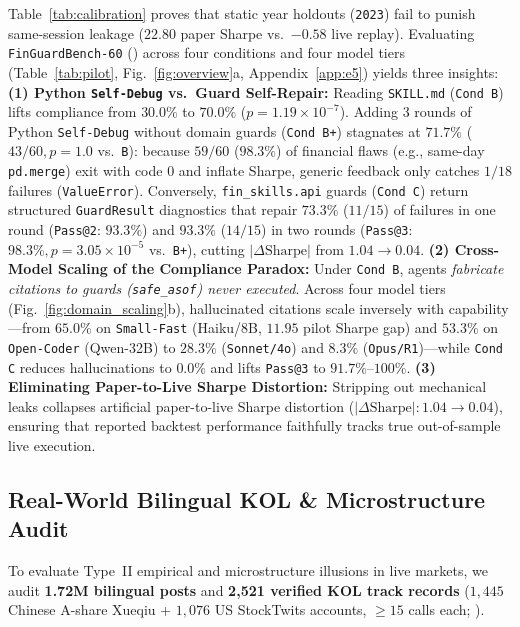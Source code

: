 Table~\ref{tab:calibration} proves that static year holdouts (\texttt{2023}) fail to punish same-session leakage ($22.80$ paper Sharpe vs.\ $-0.58$ live replay). Evaluating \texttt{FinGuardBench-60} () across four conditions and four model tiers (Table~\ref{tab:pilot}, Fig.~\ref{fig:overview}a, Appendix~\ref{app:e5}) yields three insights:
\textbf{(1) Python \texttt{Self-Debug} vs.\ Guard Self-Repair:} Reading \texttt{SKILL.md} (\texttt{Cond B}) lifts compliance from $30.0\%$ to $70.0\%$ ($p=1.19\times 10^{-7}$). Adding 3 rounds of Python \texttt{Self-Debug} \citep{chen2023selfdebug} without domain guards (\texttt{Cond B+}) stagnates at $71.7\%$ ($43/60, p=1.0$ vs.\ \texttt{B}): because $59/60$ ($98.3\%$) of financial flaws (e.g., same-day \texttt{pd.merge}) exit with code $0$ and inflate Sharpe, generic feedback only catches $1/18$ failures (\texttt{ValueError}). Conversely, \texttt{fin\_skills.api} guards (\texttt{Cond C}) return structured \texttt{GuardResult} diagnostics that repair $73.3\%$ ($11/15$) of failures in one round (\texttt{Pass@2}: $93.3\%$) and $\mathbf{93.3\%}$ ($14/15$) in two rounds (\texttt{Pass@3}: $\mathbf{98.3\%}, p=3.05\times 10^{-5}$ vs.\ \texttt{B+}), cutting $|\Delta\text{Sharpe}|$ from $1.04 \to 0.04$.
\textbf{(2) Cross-Model Scaling of the Compliance Paradox:} Under \texttt{Cond B}, agents \emph{fabricate citations to guards (\texttt{safe\_\allowbreak asof}) never executed}. Across four model tiers (Fig.~\ref{fig:domain_scaling}b), hallucinated citations scale inversely with capability---from $65.0\%$ on \texttt{Small-Fast} (Haiku/8B, $11.95$ pilot Sharpe gap) and $53.3\%$ on \texttt{Open-Coder} (Qwen-32B) to $28.3\%$ (\texttt{Sonnet/4o}) and $8.3\%$ (\texttt{Opus/R1})---while \texttt{Cond C} reduces hallucinations to $\mathbf{0.0\%}$ and lifts \texttt{Pass@3} to $91.7\%\text{--}100\%$.
\textbf{(3) Eliminating Paper-to-Live Sharpe Distortion:} Stripping out mechanical leaks collapses artificial paper-to-live Sharpe distortion ($|\Delta\text{Sharpe}|: 1.04 \to 0.04$), ensuring that reported backtest performance faithfully tracks true out-of-sample live execution.
\vspace{-0.12cm}

\subsection{Real-World Bilingual KOL \& Microstructure Audit}
\label{sec:realworld}

To evaluate Type~II empirical and microstructure illusions in live markets, we audit \textbf{1.72M bilingual posts} and \textbf{2,521 verified KOL track records} ($1{,}445$ Chinese A-share Xueqiu + $1{,}076$ US StockTwits accounts, $\ge 15$ calls each; ).

